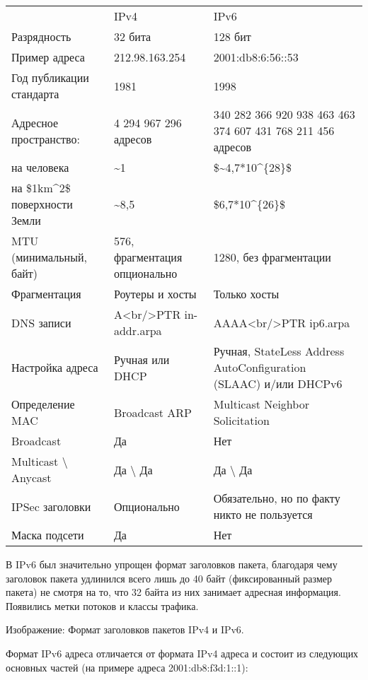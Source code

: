 \documentclass[10pt, a5paper]{article}
\begin{document}
\begin{table}
  \centering
  \begin{tabular}{ l l l }
      & IPv4  & IPv6  \\
     Разрядность  &  32 бита &  128 бит  \\
     Пример адреса  &  212.98.163.254  &  2001:db8:6:56::53  \\
     Год публикации стандарта  &  1981  &  1998  \\
     Адресное пространство:  &  4 294 967 296 адресов  &  340 282 366 920 938 463 463 374 607 431 768 211 456 адресов  \\
     на человека  &  \~{}1  &  \$\~{}4,7*10\^{}\{28\}\$  \\
     на \$1km\^{}2\$ поверхности Земли  &  \~{}8,5  &  \$6,7*10\^{}\{26\}\$  \\
     MTU (минимальный, байт)  &  576, фрагментация опционально  &  1280, без фрагментации  \\
     Фрагментация  &  Роутеры и хосты  &  Только хосты  \\
     DNS записи  &  A<br/>PTR in-addr.arpa  &  AAAA<br/>PTR ip6.arpa  \\
     Настройка адреса  &  Ручная или DHCP  &  Ручная, StateLess Address AutoConfiguration (SLAAC) и/или DHCPv6  \\
     Определение MAC  &  Broadcast ARP  &  Multicast Neighbor Solicitation  \\
     Broadcast  &  Да  &  Нет  \\
     Multicast \textbackslash{} Anycast  &  Да \textbackslash{} Да  &  Да \textbackslash{} Да  \\
     IPSec заголовки  &  Опционально  &  Обязательно, но по факту никто не пользуется \\
     Маска подсети  &  Да  &  Нет  \\
  \end{tabular}
\end{table}
В IPv6 был значительно упрощен формат заголовков пакета, благодаря чему заголовок пакета удлинился всего лишь до 40 байт (фиксированный размер пакета) не смотря на то, что 32 байта из них занимает адресная информация. Появились метки потоков и классы трафика.

Изображение: Формат заголовков пакетов IPv4 и IPv6. ~\cite{Semernik-3}



Формат IPv6 адреса отличается от формата IPv4 адреса и состоит из следующих основных частей (на примере адреса 2001:db8:f3d:1::1):
\end{document}
